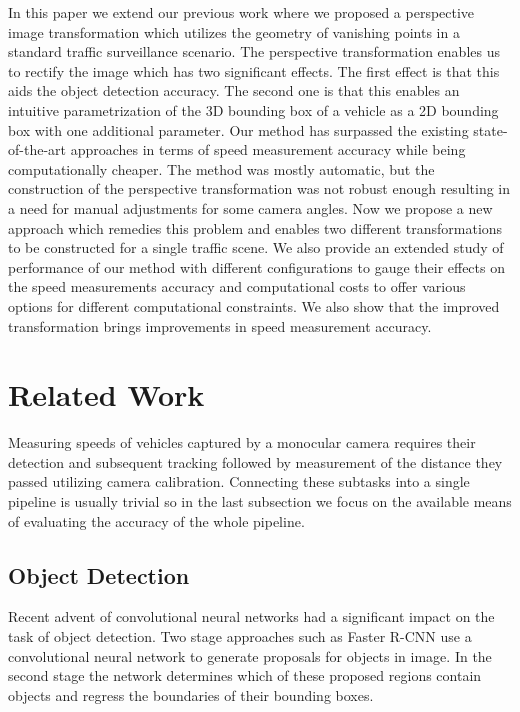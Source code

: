 \documentclass[twocolumn]{svjour3}          \smartqed  \usepackage{graphicx}
\begin{document}
In this paper we extend our previous work \cite{CVWW2019} where we proposed a perspective image transformation which utilizes the geometry of vanishing points in a standard traffic surveillance scenario. The perspective transformation enables us to rectify the image which has two significant effects. The first effect is that this aids the object detection accuracy. The second one is that this enables an intuitive parametrization of the 3D bounding box of a vehicle as a 2D bounding box with one additional parameter. Our method has surpassed the existing state-of-the-art approaches in terms of speed measurement accuracy while being computationally cheaper. The method was mostly automatic, but the construction of the perspective transformation was not robust enough resulting in a need for manual adjustments for some camera angles. Now we propose a new approach which remedies this problem and enables two different transformations to be constructed for a single traffic scene. We also provide an extended study of performance of our method with different configurations to gauge their effects on the speed measurements accuracy and computational costs to offer various options for different computational constraints. We also show that the improved transformation brings improvements in speed measurement accuracy.

\section{Related Work}

Measuring speeds of vehicles captured by a monocular camera requires their detection and subsequent tracking followed by measurement of the distance they passed utilizing camera calibration. Connecting these subtasks into a single pipeline is usually trivial so in the last subsection we focus on the available means of evaluating the accuracy of the whole pipeline.

\subsection{Object Detection}

Recent advent of convolutional neural networks had a significant impact on the task of object detection. Two stage approaches such as Faster R-CNN \cite{FasterRCNN} use a convolutional neural network to generate proposals for objects in image. In the second stage the network determines which of these proposed regions contain objects and regress the boundaries of their bounding boxes. 
\end{document}
